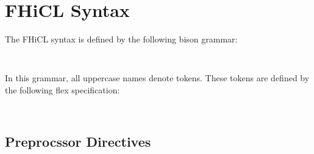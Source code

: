 \documentclass{article}
\begin{document}
\section{FHiCL Syntax}
        The FHiCL syntax is defined by the following bison grammar:
        \begin{verbatim}
                
        \end{verbatim}

        In this grammar,
        all uppercase names denote tokens.
        These tokens are defined by the following flex specification:
        \begin{verbatim}
        
        \end{verbatim}

        \subsection{Preprocssor Directives}
\end{document}
